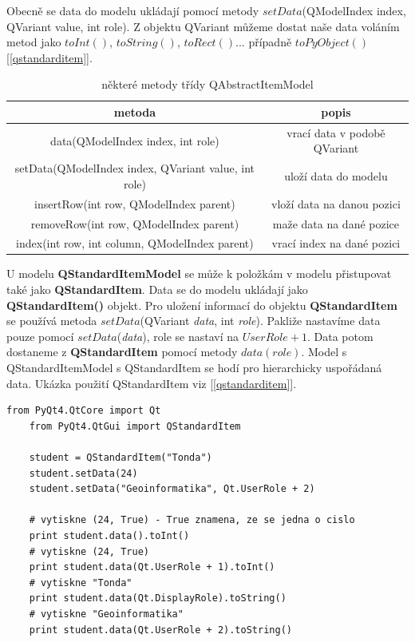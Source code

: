 Obecně se data do modelu ukládají pomocí metody $setData$(QModelIndex index, QVariant value, int role). Z objektu QVariant můžeme dostat naše data voláním metod jako $toInt()$, $toString()$, $toRect()$... případně $toPyObject()$ [\autoref{qstandarditem}]. 

\begin{table}[h]	
	\centering
{\small
	\begin{tabular}{|c|c|}
		\hline	
		{\bf metoda} & {\bf popis} \\
		\hline
		\hline
		data(QModelIndex index, int role) & vrací data v podobě QVariant \\
		\hline
		setData(QModelIndex index, QVariant value, int role) & uloží data do modelu \\
		\hline
		insertRow(int row, QModelIndex parent) & vloží data na danou pozici \\
		\hline
		removeRow(int row, QModelIndex parent) & maže data na dané pozice \\
		\hline
		index(int row, int column, QModelIndex parent) & vrací index na dané pozici \\
		\hline


	\end{tabular}
}
	\caption{některé metody třídy QAbstractItemModel}
	\label{tab:qabsmodel}
\end{table}

U modelu \textbf{QStandardItemModel} se může k položkám v modelu přistupovat také jako \textbf{QStandardItem}. Data se do modelu ukládají jako \textbf{QStandardItem()} objekt. Pro uložení informací do objektu \textbf{QStandardItem} se používá metoda $setData$(\newline QVariant \textit{data}, int \textit{role}). Pakliže nastavíme data pouze pomocí $setData$(\textit{data}), role se nastaví na $UserRole + 1$. Data potom dostaneme z \textbf{QStandardItem} pomocí metody $data(role)$. Model s QStandardItemModel s QStandardItem se hodí pro hierarchicky uspořádaná data. Ukázka použití QStandardItem viz [\autoref{qstandarditem}]. \\

\begin{lstlisting}[label=qstandarditem,caption={QStandardItem - vytvoření a získání dat}, morekeywords={PyQt4, QtCore, QtGui, QStandardItem, Qt, Qt.UserRole, Qt.DisplayRole}]
	from PyQt4.QtCore import Qt
	from PyQt4.QtGui import QStandardItem

	student = QStandardItem("Tonda")
	student.setData(24)
	student.setData("Geoinformatika", Qt.UserRole + 2)

	# vytiskne (24, True) - True znamena, ze se jedna o cislo
	print student.data().toInt() 					
	# vytiskne (24, True)
	print student.data(Qt.UserRole + 1).toInt()		
	# vytiskne "Tonda"
	print student.data(Qt.DisplayRole).toString() 	
	# vytiskne "Geoinformatika"
	print student.data(Qt.UserRole + 2).toString() 	

\end{lstlisting}

